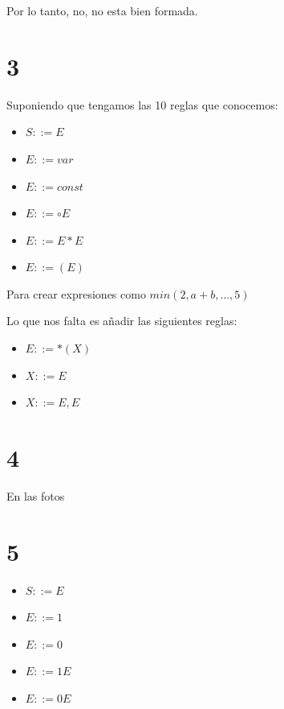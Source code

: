 \documentclass[12pt, fleqn]{article}                            %
\theoremstyle{break}                                            %
\begin{document}
    Por lo tanto, no, no esta bien formada.




\clearpage
\section{3}        

    Suponiendo que tengamos las 10 reglas que conocemos:
    \begin{itemize}
        \item $S ::= E$
        \item $E ::= var$
        \item $E ::= const$
        \item $E ::= \circ E$
        \item $E ::= E \ast E$
        \item $E ::= (E)$
    \end{itemize}

    Para crear expresiones como $min(2, a+b, \dots, 5)$

    Lo que nos falta es añadir las siguientes reglas:
    \begin{itemize}
        \item $E ::= \ast(X)$
        \item $X ::= E$
        \item $X ::= E, E$
    \end{itemize}


\section{4}
En las fotos


\vspace{1em}
\section{5}        

    \begin{itemize}
        \item $S ::= E$
        \item $E ::= 1$
        \item $E ::= 0$
        \item $E ::= 1E$
        \item $E ::= 0E$
    \end{itemize}
\end{document}
